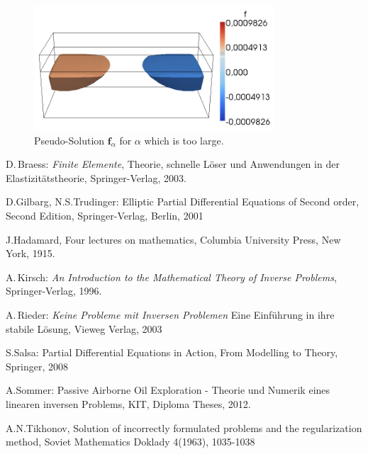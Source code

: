\documentclass[a4paper, 11pt, twoside]{article}
\begin{document}
\begin{figure}[h!]
	\centering
		\includegraphics[width=0.8\textwidth]{fig/f_inverse_big_alpha.png}
\caption{Pseudo-Solution $\boldsymbol{f}_\alpha$ for $\alpha$ which is too large.}
\label{big_alpha}
\end{figure}


\newpage
\appendix

%


\begin{thebibliography}{99}
D.\,Braess: \emph{Finite Elemente}, Theorie, schnelle L\"oser und Anwendungen in der Elastizit\"atstheorie, Springer-Verlag, 2003.

D.Gilbarg, N.S.Trudinger: Elliptic Partial Differential Equations of Second order, Second Edition, Springer-Verlag, Berlin, 2001

J.Hadamard, Four lectures on mathematics, Columbia University Press, New York, 1915.

A.\,Kirsch: \textit{An Introduction to the Mathematical Theory of Inverse Problems}, Springer-Verlag, 1996.

A.\,Rieder: \textit{Keine Probleme mit Inversen Problemen} Eine Einf\"uhrung in ihre stabile L\"osung, Vieweg Verlag, 2003

S.Salsa: Partial Differential Equations in Action, From Modelling to Theory, Springer, 2008

A.Sommer: Passive Airborne Oil Exploration - Theorie und Numerik eines linearen inversen Problems, KIT, Diploma Theses, 2012.

A.N.Tikhonov, Solution of incorrectly formulated problems and the regularization method, Soviet Mathematics Doklady 4(1963), 1035-1038
\end{thebibliography}
\end{document}
